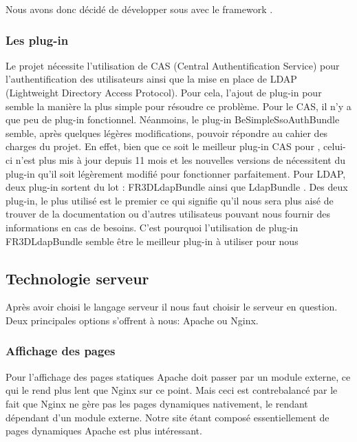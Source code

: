 \medbreak

Nous avons donc décidé de développer sous \php avec le framework \symfony.

\subsubsection{Les plug-in \symfony}

Le projet nécessite l’utilisation de CAS (Central Authentification Service) pour l’authentification des utilisateurs ainsi que la mise en place de LDAP (Lightweight Directory Access Protocol). Pour cela, l’ajout de plug-in pour \symfony semble la manière la plus simple pour résoudre ce problème.
Pour le CAS, il n’y a que peu de plug-in \symfony fonctionnel. Néanmoins, le plug-in \og BeSimpleSsoAuthBundle \fg semble, après quelques légères modifications, pouvoir répondre au cahier des charges du projet. En effet, bien que ce soit le meilleur plug-in CAS pour \symfony, celui-ci n’est plus mis à jour depuis 11 mois et les nouvelles versions de \symfony nécessitent du plug-in qu’il soit légèrement modifié pour fonctionner parfaitement.
Pour LDAP, deux plug-in sortent du lot : \og FR3DLdapBundle \fg ainsi que \og LdapBundle \fg.  Des deux plug-in, le plus utilisé est le premier ce qui signifie qu’il nous sera plus aisé de trouver de la documentation ou d’autres utilisateus pouvant nous fournir des informations en cas de besoins. C’est pourquoi l’utilisation de plug-in \og FR3DLdapBundle \fg semble être le meilleur plug-in à utiliser pour nous

\subsection{Technologie serveur}

Après avoir choisi le langage serveur il nous faut choisir le serveur en question. Deux principales options s'offrent à nous: Apache ou Nginx.

\subsubsection{Affichage des pages}
Pour l'affichage des pages statiques Apache doit passer par un module externe, ce qui le rend plus lent que Nginx sur ce point.
Mais ceci est contrebalancé par le fait que Nginx ne gère pas les pages dynamiques nativement, le rendant dépendant d'un module externe.
Notre site étant composé essentiellement de pages dynamiques Apache est plus intéressant.

